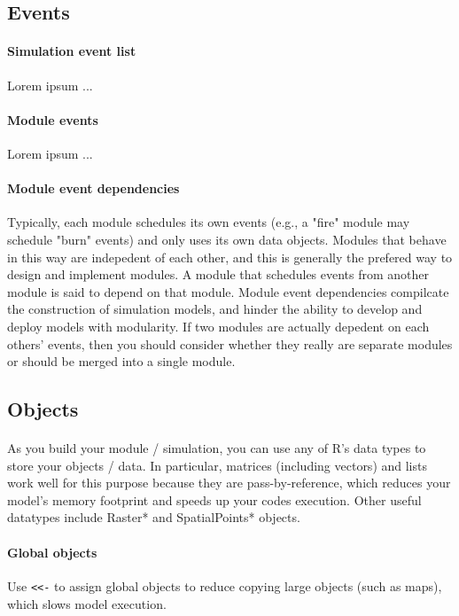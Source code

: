 \documentclass{article}
\begin{document}
\subsection{Events}

\paragraph{Simulation event list}
Lorem ipsum ...

\paragraph{Module events}
Lorem ipsum ...

\paragraph{Module event dependencies}
Typically, each module schedules its own events (e.g., a "fire" module may schedule "burn" events) and only uses its own data objects. Modules that behave in this way are indepedent of each other, and this is generally the prefered way to design and implement modules. A module that schedules events from another module is said to depend on that module. Module event dependencies compilcate the construction of simulation models, and hinder the ability to develop and deploy models with modularity. If two modules are actually depedent on each others' events, then you should consider whether they really are separate modules or should be merged into a single module.

\subsection{Objects}

\paragraph{}
As you build your module / simulation, you can use any of \textsf{R}'s data types to store your objects / data. In particular, matrices (including vectors) and lists work well for this purpose because they are pass-by-reference, which reduces your model's memory footprint and speeds up your codes execution. Other useful datatypes include Raster* and SpatialPoints* objects.

\paragraph{Global objects}
Use \texttt{<<-} to assign global objects to reduce copying large objects (such as maps), which slows model execution.
\end{document}
